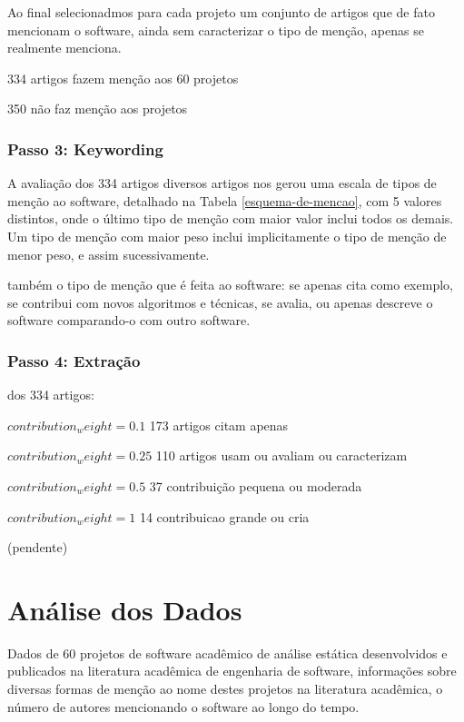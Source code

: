 Ao final selecionadmos para cada projeto um conjunto de artigos que de fato
mencionam o software, ainda sem caracterizar o tipo de menção, apenas se
realmente menciona.

334 artigos fazem menção aos 60 projetos

350 não faz menção aos projetos

\subsubsection{Passo 3: Keywording}

A avaliação dos 334 artigos diversos artigos nos gerou uma escala de tipos de menção ao
software, detalhado na Tabela \ref{esquema-de-mencao}, com 5 valores
distintos, onde o último tipo de menção com maior valor inclui todos os demais.
Um tipo de menção com maior peso inclui implicitamente o tipo de
menção de menor peso, e assim sucessivamente.

também o tipo de menção que é feita ao software: se apenas cita como exemplo,
se contribui com novos algoritmos e técnicas, se avalia, ou apenas descreve o
software comparando-o com outro software.

\subsubsection{Passo 4: Extração}

dos 334 artigos:

$contribution_weight=0.1$  173 artigos citam apenas

$contribution_weight=0.25$ 110 artigos usam ou avaliam ou caracterizam

$contribution_weight=0.5$ 37 contribuição pequena ou moderada

$contribution_weight=1$ 14 contribuicao grande ou cria

(pendente)



\section{Análise dos Dados} %

Dados de 60 projetos de software acadêmico de análise estática desenvolvidos e
publicados na literatura acadêmica de engenharia de software, informações sobre
diversas formas de menção ao nome destes projetos na literatura acadêmica,
o número de autores mencionando o software ao longo do tempo.

